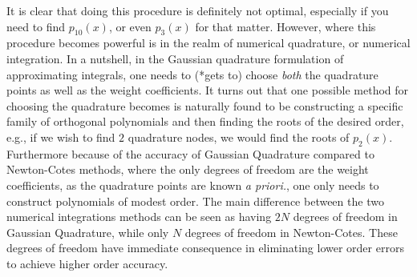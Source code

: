 It is clear that doing this procedure is definitely not optimal, especially if you need to find $p_{10}(x)$, or even $p_3(x)$ for that matter. However, where this procedure becomes powerful is in the realm of numerical quadrature, or numerical integration. In a nutshell, in the Gaussian quadrature formulation of approximating integrals, one needs to (*gets to) choose \emph{both} the quadrature points as well as the weight coefficients. It turns out that one possible method for choosing the quadrature becomes is naturally found to be constructing a specific family of orthogonal polynomials and then finding the roots of the desired order, e.g., if we wish to find $2$ quadrature nodes, we would find the roots of $p_2(x)$.\\

 Furthermore because of the accuracy of Gaussian Quadrature compared to Newton-Cotes methods, where the only degrees of freedom are the weight coefficients, as the quadrature points are known \emph{a priori.}, one only needs to construct polynomials of modest order. The main difference between the two numerical integrations methods can be seen as having $2N$ degrees of freedom in Gaussian Quadrature, while only $N$ degrees of freedom in Newton-Cotes. These degrees of freedom have immediate consequence in eliminating lower order errors to achieve higher order accuracy.

%
%
%
%
%
%
%
%
%
%
%
